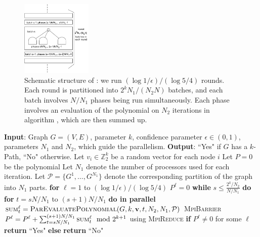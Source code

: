 \begin{figure}[h]
\centering
\includegraphics[width=0.3\textwidth]{img/parallel.pdf}
\caption{
\small
Schematic structure of \parmaxwt{}: we run $(\log{1/\epsilon})/(\log{5/4})$ rounds.
Each round is partitioned into $2^kN_1/(N_2N)$ batches, and each batch involves
$N/N_1$ phases being run simultaneously. Each phase involves an evaluation of the
polynomial on $N_2$ iterations in algorithm \parcircuit{}, which are then summed up.
}
\label{fig:parallel}
\end{figure}

\begin{algorithm}{}
\small
\caption{\parmaxwt{}$(G, k, \epsilon, N_1, N_2)$.}
\label{alg:parallel-kMLD} 
\begin{algorithmic}[1]
\STATE \textbf{Input}: Graph $G=(V,E)$, parameter $k$,
confidence parameter $\epsilon\in (0, 1)$, parameters $N_1$ and $N_2$, which guide the parallelism.
\STATE\textbf{Output}: ``Yes" if $G$ has a $k$-Path, ``No" otherwise.
\STATE 
\STATE Let $v_i \in \mathbb{Z}_2^k$ be a random vector for each node $i$
\STATE Let $P = 0$ be the polynomial
\STATE Let $N_1$ denote the number of processors used for each iteration.
Let $\mathcal{P}=\{G^1, \ldots, G^{N_1}\}$ denote the corresponding partition of the graph into $N_1$ parts.
\STATE \textbf{for} $\ell=1$ to $(\log{1/\epsilon})/(\log{5/4})$ 
\STATE \quad $P^{\ell}=0$
\STATE \quad \textbf{while} $s \leq \frac{2^k/N_2}{N/N_1}$ \textbf{do}
\STATE \quad \quad \textbf{for} $t =s N/N_1$ to $(s+ 1)N/N_1$ \textbf{do in parallel}
\STATE \quad \qquad  $\textsc{sum}^{\ell}_{t} = \textsc{ParEvaluatePolynomial}(G, k, \mathbf{v}, t, N_2, N_1, \mathcal{P})$
\STATE \quad \quad \textsc{MpiBarrier}
\STATE \quad \quad $P^{\ell} = P^{\ell} + \sum_{t=s N/N_1}^{(s+1)N/N_1} \textsc{sum}^{\ell}_{t} \mod 2^{k+1}$ using \textsc{MpiReduce}
\STATE \textbf{if} $P^{\ell}\neq 0$ for some $\ell$
\STATE \quad \textbf{return} ``Yes"
\STATE \textbf{else} 
\STATE \quad \textbf{return} ``No"
\end{algorithmic}
\end{algorithm}


